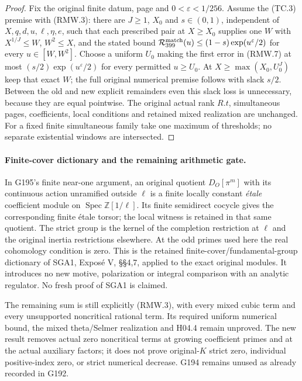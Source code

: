 \begin{proof}
Fix the original finite datum, page and $0<\varepsilon<1/256$.
Assume the (TC.3) premise with (RMW.3): there are $J\geq1$,
$X_0$ and $s\in(0,1)$, independent of $X,q,d,u,\ell,\eta,e$,
such that each prescribed pair at $X\geq X_0$ supplies one $W$
with $X^{1/J}\leq W$, $W^2\leq X$, and the stated bound
$\mathcal R_{399}^{\rm match}(u)\leq(1-s)\exp(u^\varepsilon/2)$
for every $u\in[W,W^2]$.
Choose a uniform $U_0$ making the first error in (RMW.7) at most
$(s/2)\exp(u^\varepsilon/2)$ for every permitted $u\geq U_0$.
At $X\geq\max(X_0,U_0^J)$ keep that exact $W$; the full original
numerical premise follows with slack $s/2$.
Between the old and new explicit remainders even this slack loss
is unnecessary, because they are equal pointwise.
The original actual rank $R.t$, simultaneous pages, coefficients,
local conditions and retained mixed realization are unchanged.
For a fixed finite simultaneous family take one maximum of
thresholds; no separate existential windows are intersected.
\end{proof}

\paragraph{Finite-cover dictionary and the remaining arithmetic gate.}
In G195's finite near-one argument, an original quotient
$D_O[\pi^m]$ with its continuous action unramified outside $\ell$
is a finite locally constant \emph{\'etale} coefficient module
on $\operatorname{Spec}\mathbb Z[1/\ell]$.
Its finite semidirect cocycle gives the corresponding finite
\'etale torsor; the local witness is retained in that same quotient.
The strict group is the kernel of the completion restriction at
$\ell$ and the original inertia restrictions elsewhere.
At the odd primes used here the real cohomology condition is zero.
This is the retained finite-cover/fundamental-group dictionary
of SGA1, Expos\'e V, \S\S4,7, applied to the exact original modules.
It introduces no new motive, polarization or integral comparison
with an analytic regulator. No fresh proof of SGA1 is claimed.

The remaining sum is still explicitly (RMW.3), with every mixed
cubic term and every unsupported noncritical rational term.
Its required uniform numerical bound, the mixed theta/Selmer
realization and H04.4 remain unproved. The new result removes
actual zero noncritical terms at growing coefficient primes and
at the actual auxiliary factors; it does not prove original-$K$
strict zero, individual positive-index zero, or strict numerical
decrease. G194 remains unused as already recorded in G192.
